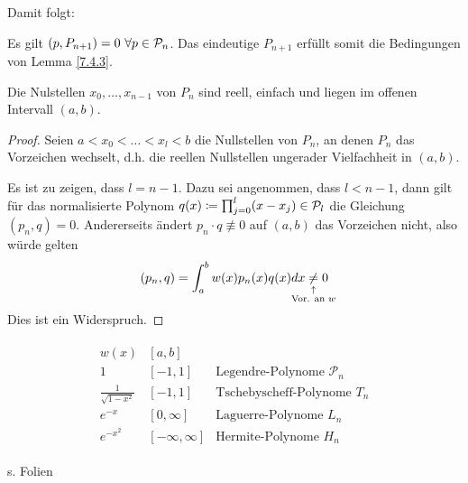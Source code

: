 Damit folgt:


\begin{Kore}
  \label{7.4.5}
  Es gilt $(p,P_{n+1})=0~\forall p\in\mathcal{P}_n$.
  Das eindeutige $P_{n+1}$ erfüllt somit die
  Bedingungen von Lemma \ref{7.4.3}.
\end{Kore}


\begin{Satze}
  Die Nulstellen $x_0,\ldots,x_{n-1}$ von $P_n$
  sind reell, einfach und liegen im offenen Intervall $(a,b)$.

  \begin{proof}
    Seien $a<x_0<\ldots<x_l<b$ die Nullstellen von $P_n$,
    an denen $P_n$ das Vorzeichen wechselt,
    d.h. die reellen Nullstellen ungerader Vielfachheit in $(a,b)$.

    Es ist zu zeigen, dass $l=n-1$.
    Dazu sei angenommen, dass $l<n-1$, 
    dann gilt für das normalisierte Polynom
    $q(x)\coloneqq \prod_{j=0}^{l}(x-x_j)\in\mathcal{P}_l$ die
    Gleichung $(p_n,q)=0$.
    Andererseits ändert $p_n\cdot q\not\equiv 0$ 
    auf $(a,b)$ das  Vorzeichen nicht, also würde gelten
    \begin{gather*}
      (p_n,q)=\int_a^bw(x)p_n(x)q(x)dx
      \underset{\mathclap{\substack{\uparrow\\\text{Vor. an $w$}}}}{\neq} 0
    \end{gather*}
    Dies ist ein Widerspruch.
  \end{proof}
\end{Satze}

\begin{Bspe}
  \begin{align*}
    \begin{array}{lll}
      w(x) & [a,b] \\
      1    & [-1,1] & \text{Legendre-Polynome }\mathcal{P}_n\\
      \frac{1}{\sqrt{1-x^2}} & [-1,1] & \text{Tschebyscheff-Polynome }
                                        T_n\\
      e^{-x} & [0,\infty] &\text{Laguerre-Polynome } L_n\\
      e^{-x^2}& [-\infty,\infty] & \text{Hermite-Polynome } H_n
    \end{array}
  \end{align*}
\end{Bspe}

\begin{Satze}\label{7.4.8} %
  s. Folien
\end{Satze}

